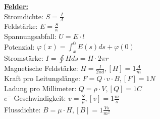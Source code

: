 \documentclass[11pt]{article}
\begin{document}
\begin{minipage}{0.45\textwidth}
\underline{\textbf{Felder: }}\\
Stromdichte: $S=\frac{I}{A}$\\
Feldstärke: $E=\frac{S}{\kappa}$\\
Spannungsabfall: $U=E \cdot l$\\
    Potenzial: $\varphi (x)= \int_x^0 E(s)ds + \varphi(0)$\\
Stromstärke: $I = \oint H ds = H \cdot 2\pi r$\\
Magnetische Feldstärke: $H = \frac{I}{2\pi d}, [H] = 1\frac{A}{m}$\\
Kraft pro Leitungslänge: $F=Q \cdot v \cdot B, [F] = 1N$\\
Ladung pro Millimeter: $Q = \rho \cdot V, [Q] = 1C$\\
$e^-$-Geschwindigkeit: $v = \frac{S}{\rho}, [v] = 1\frac{m}{s}$\\
Flussdichte: $B=\mu \cdot H, [B] = 1 \frac{Vs}{m^2}$\\




\end{minipage}%
~~~~~~~
\end{document}
